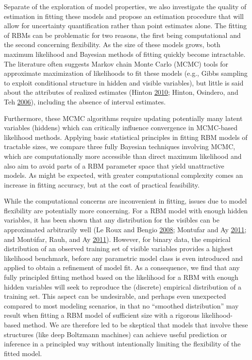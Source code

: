 \documentclass[]{article}
\theoremstyle{definition}
\begin{document}
Separate of the exploration of model properties, we also investigate the
quality of estimation in fitting these models and propose an estimation
procedure that will allow for uncertainty quantification rather than
point estimates alone. The fitting of RBMs can be problematic for two
reasons, the first being computational and the second concerning
flexibility. As the size of these models grows, both maximum likelihood
and Bayesian methods of fitting quickly become intractable. The
literature often suggests Markov chain Monte Carlo (MCMC) tools for
approximate maximization of likelihoods to fit these models (e.g., Gibbs
sampling to exploit conditional structure in hidden and visible
variables), but little is said about the attributes of realized
estimates (Hinton \protect\hyperlink{ref-hinton2010practical}{2010};
Hinton, Osindero, and Teh \protect\hyperlink{ref-hinton2006fast}{2006}),
including the absence of interval estimates.

Furthermore, these MCMC algorithms require updating potentially many
latent variables (hiddens) which can critically influence convergence in
MCMC-based likelihood methods. Applying basic statistical principles in
fitting RBM models of tractable sizes, we compare three fully Bayesian
techniques involving MCMC, which are computationally more accessible
than direct maximum likelihood and also aim to avoid parts of a RBM
parameter space that yield unattractive models. As might be expected,
with greater computational complexity comes an increase in fitting
accuracy, but at the cost of practical feasibility.

While the computational concerns are inconvenient in fitting, issues due
to model flexibility are potentially more concerning. For a RBM model
with enough hidden variables, it has been shown that any distribution
for the visibles can be approximated arbitrarily well (Le Roux and
Bengio \protect\hyperlink{ref-le2008representational}{2008}; Montufar
and Ay \protect\hyperlink{ref-montufar2011refinements}{2011}; and
Montúfar, Rauh, and Ay
\protect\hyperlink{ref-montufar2011expressive}{2011}). However, for
binary data, the empirical distribution of an observed training set of
visible variables provides a highest likelihood benchmark, before any
parametric model class is even introduced and applied to obtain a
refinement of model fit. As a consequence, we find that any fully
principled fitting method based on the likelihood for a RBM with enough
hidden variables will seek to reproduce the (discrete) empirical
distribution of a training set. This aspect can be undesirable, and
perhaps even unexpected compared to most modeling scenarios, in that no
``smoothed distribution'' may result when fitting a RBM model of
sufficient size with a rigorous likelihood-based method. We are
therefore led to be skeptical that models that involve these structures
(like deep Boltzmann machines) can achieve useful prediction or
inference in a principled way without intentionally limiting the
flexibility of the fitted model.
\end{document}
